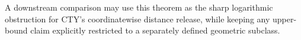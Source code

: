 A downstream comparison may use this theorem as the sharp logarithmic obstruction for CTY's coordinatewise distance release, while keeping any upper-bound claim explicitly restricted to a separately defined geometric subclass.